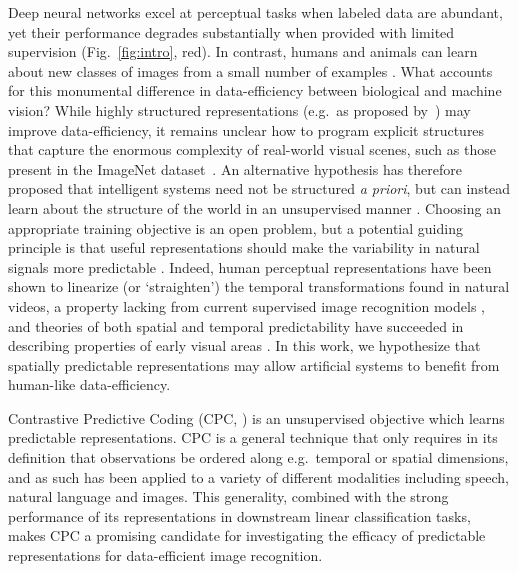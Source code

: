 \documentclass{article}
\begin{document}
Deep neural networks excel at perceptual tasks when labeled data are abundant, yet their performance degrades substantially when provided with limited supervision (Fig.\ \ref{fig:intro}, red). In contrast, humans and animals can learn about new classes of images from a small number of examples \citep{landau1988importance, markman1989categorization}. What accounts for this monumental difference in data-efficiency between biological and machine vision? While highly structured representations (e.g.\ as proposed by~\citet{lake2015human}) may improve data-efficiency, it remains unclear how to program explicit structures that capture the enormous complexity of real-world visual scenes, such as those present in the ImageNet dataset~\citep{russakovsky2015imagenet}. An alternative hypothesis has therefore proposed that intelligent systems need not be structured \textit{a priori}, but can instead learn about the structure of the world in an unsupervised manner \citep{barlow1988unsup, hinton1999unsup, lecun2015deep}. Choosing an appropriate training objective is an open problem, 
but a potential guiding principle is that useful representations should make the variability in natural signals more predictable \citep{Tishby1999, wiskott2002slow, Richthofer2016}. Indeed, human perceptual representations have been shown to linearize (or `straighten') the temporal transformations found in natural videos, a property lacking from current supervised image recognition models \citep{henaff2019perceptual}, and theories of both spatial and temporal predictability have succeeded in describing properties of early visual areas \citep{rao1999predictive, palmer2015predictive}. In this work, we hypothesize that spatially predictable representations may allow artificial systems to benefit from human-like data-efficiency.

Contrastive Predictive Coding (CPC, \citet{oord2018representation}) is an unsupervised objective which learns predictable representations. CPC is a general technique that only requires in its definition that observations be ordered along e.g.\ temporal or spatial dimensions, and as such has been applied to a variety of different modalities including speech, natural language and images. This generality, combined with the strong performance of its representations in downstream linear classification tasks, makes CPC a promising candidate for investigating the efficacy of predictable representations for data-efficient image recognition.
\end{document}
